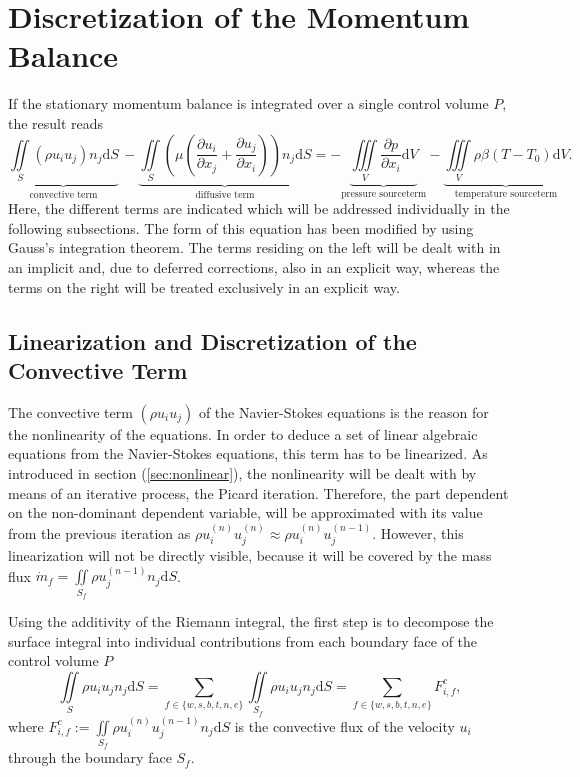 \section{Discretization of the Momentum Balance}
\label{sec:segdiscretization}

If the stationary momentum balance is integrated over a single control volume \(P\), the result reads
\begin{equation}
  \label{eq:semidiscrete}
  \underbrace{\iint\limits_S (\rho u_i u_j)n_j \mathrm{d}S}_{\text{convective term}}
  \,- \underbrace{\iint\limits_S \left(\mu \left( \frac{\partial u_i}{\partial x_j} + \frac{\partial u_j}{\partial x_i}\right)\right)n_j \mathrm{d}S}_{\text{diffusive term}}
  = - \underbrace{\iiint\limits_V \frac{\partial p}{\partial x_i} \mathrm{d}V}_{\text{pressure sourceterm}}
  - \underbrace{\iiint\limits_V \rho \beta \left(T - T_0\right) \mathrm{d}V}_{\text{temperature sourceterm}}.
\end{equation}
Here, the different terms are indicated which will be addressed individually in the following subsections. The form of this equation has been modified by using Gauss's integration theorem. The terms residing on the left will be dealt with in an implicit and, due to deferred corrections, also in an explicit way, whereas the terms on the right will be treated exclusively in an explicit way.

\subsection{Linearization and Discretization of the Convective Term}
\label{sec:segconvective}

The convective term \(\left( \rho u_i u_j \right)\) of the Navier-Stokes equations is the reason for the nonlinearity of the equations. In order to deduce a set of linear algebraic equations from the Navier-Stokes equations, this term has to be linearized. As introduced in section (\ref{sec:nonlinear}), the nonlinearity will be dealt with by means of an iterative process, the Picard iteration. Therefore, the part dependent on the non-dominant dependent variable, will be approximated with its value from the previous iteration as \( \rho u_i^{(n)} u_j^{(n)} \approx \rho u_i^{(n)} u_j^{(n-1)} \). However, this linearization will not be directly visible, because it will be covered by the mass flux \(\textstyle \dot{m}_f = \iint\limits_{S_f} \rho u_j^{(n-1)} n_j \mathrm{d}S \). 

Using the additivity of the Riemann integral, the first step is to decompose the surface integral into individual contributions from each boundary face of the control volume \(P\)
\begin{displaymath}
  \iint\limits_S \rho u_i u_jn_j \mathrm{d}S
  = \sum_{f \in \{w,s,b,t,n,e\}} \iint\limits_{S_f}\rho u_{i} u_{j} n_{j} \mathrm{d}S
  = \sum_{f \in \{w,s,b,t,n,e\}} F_{i,f}^{c},
\end{displaymath}
where \(\textstyle F_{i,f}^c := \iint\limits_{S_f} \rho u_{i}^{(n)} u_{j}^{(n-1)} n_{j} \mathrm{d}S \) is the convective flux of the velocity \(u_i\) through the boundary face \(S_f\). 
      
